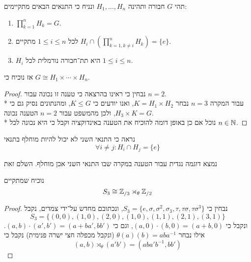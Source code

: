 \Question{}
\Subquestion{}
תהי $G$ חבורה ותהינה $H_1, \dots, H_n$ ונניח כי התנאים הבאים מתקיימים:
\begin{enumerate}
	\item $\prod_{k = 1}^n H_k = G$.
	\item לכל $1 \le i \le n$ מתקיים $H_i \cap (\prod_{k = 1, k \ne i}^n H_k) = \{e\}$.
	\item $H_i$ היא תת־חבורה נורמלית לכל $1 \le i \le n$.
\end{enumerate}
אז נוכיח כי $G \cong H_1 \times \cdots \times H_n$.
\begin{proof}
	נבחין כי ראינו בהרצאה כי טענה זו נכונה עבור $n = 2$. \\*
	עבור המקרה $n = 3$ נבחר $K = H_1 \times H_2$, ואנו יודעים כי $K \le G$, ומהנתונים נסיק גם כי $H_3 \times K = G$, ולכן מהמשפט עבור $n = 2$ הטענה נכונה. \\*
	נוכל אם כן באופן דומה להוכיח את הטענה באינדוקציה וקבל כי היא נכונה לכל $n \in \mathbb{N}$.
\end{proof}

\Subquestion{}
נראה כי התנאי השני לא יכול להיות מוחלף בתנאי
\[
	\forall i \ne j : H_i \cap H_j = \{ e \}
\]

נמצא דוגמה נגדית עבור הטענה במקרה שבו התנאי השני אכן מוחלף.
השלם זאת

\Question{}
נוכיח שמתקיים
\[
	S_3 \cong \mathbb{Z}_{/3} \rtimes_\theta \mathbb{Z}_{/2}
\]
\begin{proof}
	נבחין כי $S_3 = \{ e, \sigma, \sigma^2, \sigma_3, \tau, \tau \sigma, \tau \sigma^3 \}$, ונכתובם מחדש על־ידי צמדים, נקבל
	\[
		S_3 = \{ (0, 0), (1, 0), (2, 0), (1, 0), (1, 1), (2, 1), (3, 1) \}
	\]
	ונקבל כי $(a, 0) \cdot (b, 0) = (a + b, 0)$, וגם כי $(a, b) \cdot (a', b') = (a + b a', b b')$.
	אילו נבחר $\theta(a)(b) = a b a^{-1}$ (ונקבל מכפלה חצי ישרה פנימית) נקבל כי
	\[
		(a, b) \rtimes_\theta (a' b') = (a b a' b^{-1}, b b')
	\]
\end{proof}


